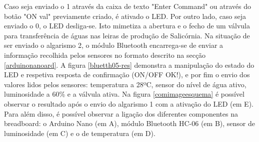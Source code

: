 Caso seja enviado o 1 através da caixa de texto "Enter Command" ou através do botão "ON val" previamente criado, é ativado o LED. Por outro lado, caso seja enviado o 0,  o LED desliga-se. Isto mimetiza a abertura e o fecho de um válvula para transferência de águas nas leiras de produção de Salicórnia. Na situação de ser enviado o algarismo 2, o módulo Bluetooth encarrega-se de enviar a informação recolhida pelos sensores no formato descrito na secção \ref{arduinonanoard}. A figura \ref{bluetth05-res} demonstra a manipulação do estado do LED e respetiva resposta de confirmação (ON/OFF OK!), e por fim o envio dos valores lidos pelos sensores: temperatura a 28ºC, sensor do nível de água ativo, luminosidade a 60\% e a válvula ativa. Na figura \ref{comimageesquema} é possível observar o resultado após o envio do algarismo 1 com a ativação do LED (em E). Para além disso, é possível observar a ligação dos diferentes componentes na breadboard: o Arduino Nano (em A), módulo Bluetooth HC-06 (em B), sensor de luminosidade (em C) e o de temperatura (em D). 





